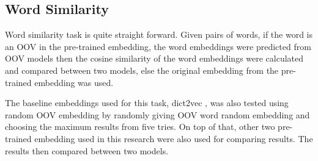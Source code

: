     \subsection{Word Similarity}
        Word similarity task is quite straight forward. Given pairs of
        words, if the word is an OOV in the pre-trained embedding, the
        word embeddings were predicted from OOV models then the cosine
        similarity of the word embeddings were calculated and compared
        between two models, else the original embedding from the
        pre-trained embedding was used. 
        
        The baseline embeddings used for this task, dict2vec
        \citep{dict2vect2017tissier}, was also tested using random OOV
        embedding by randomly giving OOV word random embedding and
        choosing the maximum results from five tries. On top of that,
        other two pre-trained embedding used in this research were
        also used for comparing results. The results then compared
        between two models.